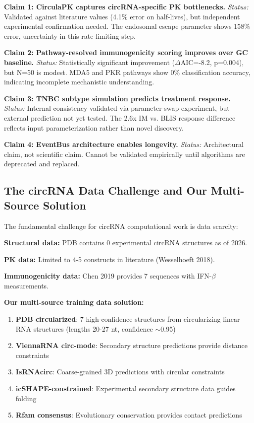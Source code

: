\documentclass[12pt]{article}
\begin{document}
\textbf{Claim 1: CirculaPK captures circRNA-specific PK bottlenecks.}
\textit{Status:} Validated against literature values (4.1\% error on half-lives), but independent experimental confirmation needed. The endosomal escape parameter shows 158\% error, uncertainty in this rate-limiting step.

\textbf{Claim 2: Pathway-resolved immunogenicity scoring improves over GC baseline.}
\textit{Status:} Statistically significant improvement ($\Delta$AIC=-8.2, p=0.004), but N=50 is modest. MDA5 and PKR pathways show 0\% classification accuracy, indicating incomplete mechanistic understanding.

\textbf{Claim 3: TNBC subtype simulation predicts treatment response.}
\textit{Status:} Internal consistency validated via parameter-swap experiment, but external prediction not yet tested. The 2.6x IM vs. BLIS response difference reflects input parameterization rather than novel discovery.

\textbf{Claim 4: EventBus architecture enables longevity.}
\textit{Status:} Architectural claim, not scientific claim. Cannot be validated empirically until algorithms are deprecated and replaced.

\subsection{The circRNA Data Challenge and Our Multi-Source Solution}

The fundamental challenge for circRNA computational work is data scarcity:

\textbf{Structural data:} PDB contains 0 experimental circRNA structures as of 2026.

\textbf{PK data:} Limited to 4-5 constructs in literature (Wesselhoeft 2018).

\textbf{Immunogenicity data:} Chen 2019 provides 7 sequences with IFN-$\beta$ measurements.

\textbf{Our multi-source training data solution:}

\begin{enumerate}
\item \textbf{PDB circularized}: 7 high-confidence structures from circularizing linear RNA structures (lengths 20-27 nt, confidence $\sim$0.95)

\item \textbf{ViennaRNA circ-mode}: Secondary structure predictions provide distance constraints

\item \textbf{IsRNAcirc}: Coarse-grained 3D predictions with circular constraints

\item \textbf{icSHAPE-constrained}: Experimental secondary structure data guides folding

\item \textbf{Rfam consensus}: Evolutionary conservation provides contact predictions
\end{enumerate}
\end{document}
